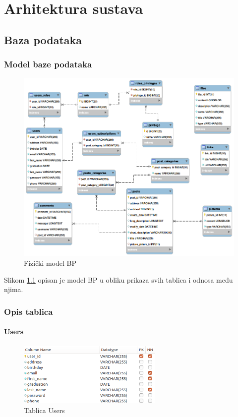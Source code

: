 \documentclass[zavrsni, numeric]{fer}
\begin{document}
\chapter{Arhitektura sustava}
\section{Baza podataka}
\subsection{Model baze podataka}

\begin{figure}[H]
	\centering
	\includegraphics[width=13cm]{slike/fizicki-model.png}
	\caption{Fizički model BP}
	\label{fig:fizicki-model}
\end{figure}

Slikom \ref{fig:fizicki-model} opisan je model BP u obliku prikaza svih tablica i odnosa među njima.

\subsection{Opis tablica}

\subsubsection{Users}

\begin{figure}[H]
	\centering
	\includegraphics[width=7cm]{slike/t-users.png}
	\caption{Tablica Users}
	\label{fig:t-users}
\end{figure}
\end{document}
